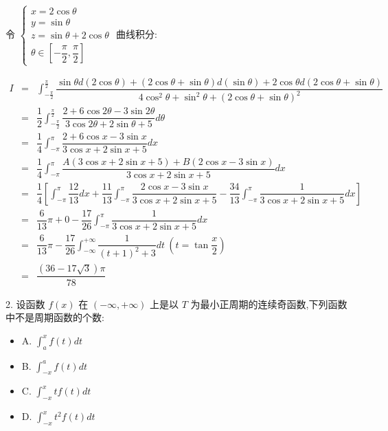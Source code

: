 \begin{solution}

	令 $\begin{cases}
		x = 2\cos \theta\\
		y = \sin \theta\\
		z = \sin \theta + 2\cos \theta\\
		\theta \in [-\dfrac{\pi}{2},\dfrac{\pi}{2}]
	\end{cases}$ 曲线积分:

	\begin{eqnarray*}
		I & = & \int_{-\frac{\pi}{2}}^{\frac{\pi}{2}}\dfrac{\sin\theta d(2\cos\theta) + (2\cos\theta+\sin\theta) d(\sin\theta) + 2\cos\theta d(2\cos\theta+\sin\theta)}{4\cos^{2}\theta+\sin^{2}\theta+(2\cos\theta + \sin\theta)^{2}}\\
		  & = & \dfrac{1}{2}\int_{-\frac{\pi}{2}}^{\frac{\pi}{2}}\dfrac{2+6\cos 2\theta-3\sin 2\theta}{3\cos 2\theta+2\sin\theta+5}d\theta\\
		  & = & \dfrac{1}{4}\int_{-\pi}^{\pi}\dfrac{2+6\cos x-3\sin x}{3\cos x+2\sin x+5}dx\\
		  & = & \dfrac{1}{4}\int_{-\pi}^{\pi}\dfrac{A(3\cos x +2\sin x+5)+B(2\cos x-3\sin x)}{3\cos x+2\sin x+5}dx\\
		  & = & \dfrac{1}{4}\left[ \int_{-\pi}^{\pi}\dfrac{12}{13}dx+\dfrac{11}{13}\int_{-\pi}^{\pi}\dfrac{2\cos x-3\sin x}{3\cos x+2\sin x+5}-\dfrac{34}{13}\int_{-\pi}^{\pi}\dfrac{1}{3\cos x+2\sin x+5}dx\right]\\
		  & = & \dfrac{6}{13}\pi+0-\dfrac{17}{26}\int_{-\pi}^{\pi}\dfrac{1}{3\cos x+2\sin x+5}dx\\
		  & = & \dfrac{6}{13}\pi - \dfrac{17}{26}\int_{-\infty}^{+\infty} \dfrac{1}{(t+1)^{2}+3}dt\ (t=\tan\dfrac{x}{2})\\
		  & = & \dfrac{(36-17\sqrt{3})\pi}{78}
	\end{eqnarray*}
\end{solution}


2. 设函数 $f(x)$ 在 $(-\infty,+\infty)$ 上是以 $T$ 为最小正周期的连续奇函数,下列函数中不是周期函数的个数:  
\begin{itemize}
	\item A. $\int_{a}^{x}f(t)dt$
	\item B. $\int_{-x}^{a}f(t)dt$
	\item C. $\int_{-x}^{x}tf(t)dt$
	\item D. $\int_{-x}^{x}t^2f(t)dt$
\end{itemize}


